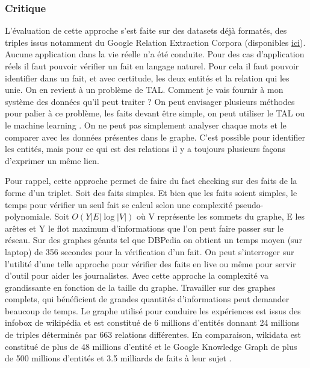 \subsubsection{Critique}

L'évaluation de cette approche s'est faite sur des datasets déjà formatés, des triples issus notamment du Google Relation Extraction Corpora
(disponibles \href{https://github.com/google-research-datasets/relation-extraction-corpus}{ici}). Aucune application dans la vie réelle n'a été conduite. Pour des cas d'application réels il faut pouvoir vérifier un fait en langage naturel. Pour cela il faut pouvoir identifier dans un fait, et avec certitude, les deux entités et la relation qui les unie. On en revient à un problème de TAL. Comment je vais fournir à mon système des données qu'il peut traiter ? On peut envisager plusieurs méthodes pour palier à ce problème, les faits devant être simple, on peut utiliser le TAL ou le machine learning \cite{googleai}. On ne peut pas simplement analyser chaque mots et le comparer avec les données présentes dans le graphe. C'est possible pour identifier les entités, mais pour ce qui est des relations il y a toujours plusieurs façons d'exprimer un même lien.

Pour rappel, cette approche permet de faire du fact checking sur des faits de la forme d'un triplet. Soit des faits simples. Et bien que les faits soient simples, le temps pour vérifier un seul fait se calcul selon une complexité pseudo-polynomiale. Soit $ O(Y|E|\log |V|)$ où V représente les sommets du graphe, E les arêtes et Y le flot maximum d'informations que l'on peut faire passer sur le réseau. Sur des graphes géants tel que DBPedia on obtient un temps moyen (sur laptop) de 356 secondes pour la vérification d'un fait. On peut s'interroger sur l'utilité d'une telle approche pour vérifier des faits en live ou même pour servir d'outil pour aider les journalistes. Avec cette approche la complexité va grandissante en fonction de la taille du graphe. Travailler sur des graphes complets, qui bénéficient de grandes quantités d'informations peut demander beaucoup de temps. Le graphe utilisé pour conduire les expériences est issus des infobox de wikipédia et est constitué de 6 millions d'entités donnant 24 millions de triples déterminés par 663 relations différentes. En comparaison, wikidata est constitué de plus de 48 millions d'entité \cite{wikidata:statistics} \cite{wikidata:statistics2} et le Google Knowledge Graph de plus de 500 millions d'entités et 3.5 milliards de faits à leur sujet \cite{google:kg}.

